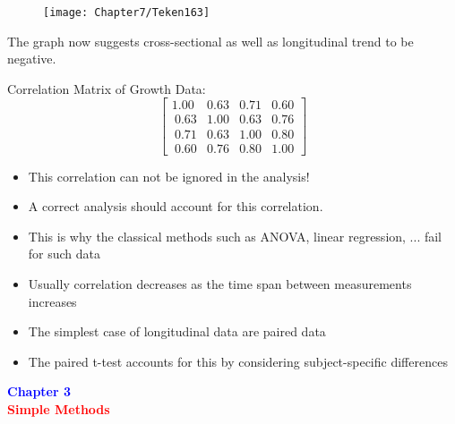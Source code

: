 \documentclass{beamer}
\begin{document}
\begin{frame}
\text{{\textcolor{blue}{Second case:}}}
\begin{figure}[h!]
\centering
\texttt{[image: Chapter7/Teken163]}
\end{figure}
The graph now suggests cross-sectional as well as longitudinal trend to be negative.
\end{frame}

\begin{frame}
Correlation Matrix of Growth Data:
\vspace*{2mm}
\[ \left[ \begin{array}{cccc}
1.00 & 0.63 & 0.71 & 0.60 \\\
0.63 & 1.00 & 0.63 & 0.76 \\\
0.71 & 0.63 & 1.00 & 0.80 \\\
0.60 & 0.76 & 0.80& 1.00 \end{array} \right]\]
\begin{itemize}
\item This correlation can not be ignored in the analysis!
\end{itemize}
\end{frame}

\begin{frame}
\begin{itemize}
\item A correct analysis should account for this correlation. \vspace{0.25cm}
\item This is why the classical methods such as ANOVA, linear regression, ... fail for such data \vspace{0.25cm}
\item Usually correlation  decreases as the time span between measurements increases \vspace{0.25cm}
\item The simplest case of longitudinal data are paired data \vspace{0.25cm}
\item The paired t-test accounts for this by considering subject-specific differences
\end{itemize}
\end{frame}

\begin{frame}
\centering
\Large
\textbf{\textcolor{blue} {Chapter 3}}\\
\vspace*{3mm}
\textbf{\textcolor{red} {Simple Methods}}
\end{frame}
\end{document}
